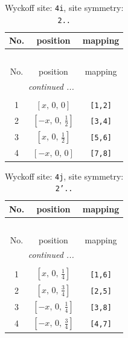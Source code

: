 \documentclass[fleqn,8pt]{jsarticle}
\begin{document}
\begin{longtable}{ccc}
\caption{Wyckoff site: {\tt 4i}, site symmetry: {\tt 2..}}
 \\
 \hline \hline
No. & position & mapping \\ \hline \endfirsthead

\multicolumn{2}{l}{\tablename\ \thetable{}} \\
 \hline \hline
No. & position & mapping \\ \hline \endhead

 \hline \hline
\multicolumn{2}{r}{\footnotesize\it continued ...} \\ \endfoot

 \hline \hline
\multicolumn{2}{r}{} \\ \endlastfoot

1 & $\left[ x,\, 0,\, 0 \right]$ & {\tt [1,2]} \\ \hline
2 & $\left[ - x,\, 0,\, \frac{1}{2} \right]$ & {\tt [3,4]} \\ \hline
3 & $\left[ x,\, 0,\, \frac{1}{2} \right]$ & {\tt [5,6]} \\ \hline
4 & $\left[ - x,\, 0,\, 0 \right]$ & {\tt [7,8]} \\
\end{longtable}
\renewcommand{\arraystretch}{1.2}
\begin{longtable}{ccc}
\caption{Wyckoff site: {\tt 4j}, site symmetry: {\tt 2'..}}
 \\
 \hline \hline
No. & position & mapping \\ \hline \endfirsthead

\multicolumn{2}{l}{\tablename\ \thetable{}} \\
 \hline \hline
No. & position & mapping \\ \hline \endhead

 \hline \hline
\multicolumn{2}{r}{\footnotesize\it continued ...} \\ \endfoot

 \hline \hline
\multicolumn{2}{r}{} \\ \endlastfoot

1 & $\left[ x,\, 0,\, \frac{1}{4} \right]$ & {\tt [1,6]} \\ \hline
2 & $\left[ x,\, 0,\, \frac{3}{4} \right]$ & {\tt [2,5]} \\ \hline
3 & $\left[ - x,\, 0,\, \frac{1}{4} \right]$ & {\tt [3,8]} \\ \hline
4 & $\left[ - x,\, 0,\, \frac{3}{4} \right]$ & {\tt [4,7]} \\
\end{longtable}
\end{document}
